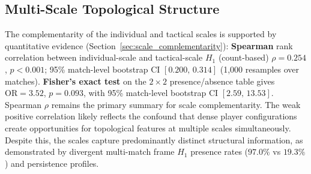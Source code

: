 \subsection{Multi-Scale Topological Structure}
\label{sec:scale_complementarity_discussion}

The complementarity of the individual and tactical scales is supported by quantitative evidence (Section~\ref{sec:scale_complementarity}): \textbf{Spearman} rank correlation between individual-scale and tactical-scale \(H_1\) (count-based) \(\rho=0.254\), \(p<0.001\); 95\% match-level bootstrap CI \([0.200,\,0.314]\) (1{,}000 resamples over matches). \textbf{Fisher's exact test} on the \(2\times2\) presence/absence table gives \(\mathrm{OR}=3.52\), \(p=0.093\), with 95\% match-level bootstrap CI \([2.59,\,13.53]\). Spearman \(\rho\) remains the primary summary for scale complementarity. The weak positive correlation likely reflects the confound that dense player configurations create opportunities for topological features at multiple scales simultaneously. Despite this, the scales capture predominantly distinct structural information, as demonstrated by divergent multi-match frame \(H_1\) presence rates ($97.0\%$ vs $19.3\%$) and persistence profiles.

